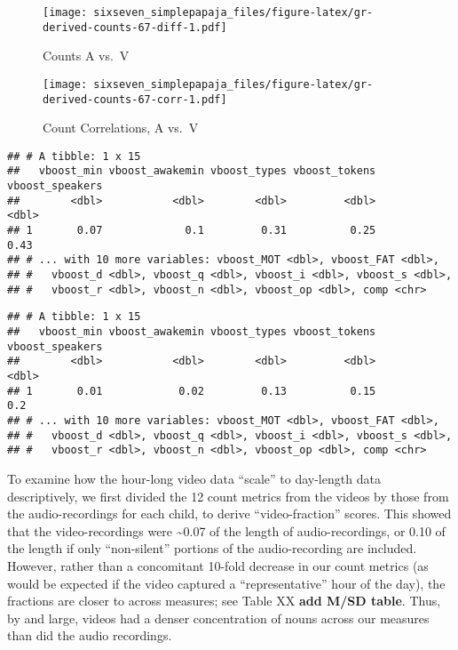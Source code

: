 \documentclass[floatsintext,man]{apa6}
\theoremstyle{definition}
\theoremstyle{definition}
\theoremstyle{definition}
\theoremstyle{remark}
\begin{document}
\begin{figure}
\centering
\texttt{[image: sixseven\_simplepapaja\_files/figure-latex/gr-derived-counts-67-diff-1.pdf]}
\caption{\label{fig:gr-derived-counts-67-diff}Counts A vs.~V}
\end{figure}

\begin{figure}
\centering
\texttt{[image: sixseven\_simplepapaja\_files/figure-latex/gr-derived-counts-67-corr-1.pdf]}
\caption{\label{fig:gr-derived-counts-67-corr}Count Correlations, A vs.~V}
\end{figure}

\begin{verbatim}
## # A tibble: 1 x 15
##   vboost_min vboost_awakemin vboost_types vboost_tokens vboost_speakers
##        <dbl>           <dbl>        <dbl>         <dbl>           <dbl>
## 1       0.07             0.1         0.31          0.25            0.43
## # ... with 10 more variables: vboost_MOT <dbl>, vboost_FAT <dbl>,
## #   vboost_d <dbl>, vboost_q <dbl>, vboost_i <dbl>, vboost_s <dbl>,
## #   vboost_r <dbl>, vboost_n <dbl>, vboost_op <dbl>, comp <chr>
\end{verbatim}

\begin{verbatim}
## # A tibble: 1 x 15
##   vboost_min vboost_awakemin vboost_types vboost_tokens vboost_speakers
##        <dbl>           <dbl>        <dbl>         <dbl>           <dbl>
## 1       0.01            0.02         0.13          0.15             0.2
## # ... with 10 more variables: vboost_MOT <dbl>, vboost_FAT <dbl>,
## #   vboost_d <dbl>, vboost_q <dbl>, vboost_i <dbl>, vboost_s <dbl>,
## #   vboost_r <dbl>, vboost_n <dbl>, vboost_op <dbl>, comp <chr>
\end{verbatim}

To examine how the hour-long video data \enquote{scale} to day-length
data descriptively, we first divided the 12 count metrics from the
videos by those from the audio-recordings for each child, to derive
\enquote{video-fraction} scores. This showed that the video-recordings
were \textasciitilde{}0.07 of the length of audio-recordings, or 0.10 of
the length if only \enquote{non-silent} portions of the audio-recording
are included. However, rather than a concomitant 10-fold decrease in our
count metrics (as would be expected if the video captured a
\enquote{representative} hour of the day), the fractions are closer to
across measures; see Table XX \textbf{add M/SD table}. Thus, by and
large, videos had a denser concentration of nouns across our measures
than did the audio recordings.
\end{document}
